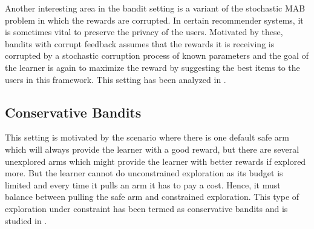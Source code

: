 Another interesting area in the bandit setting is a variant of the stochastic MAB problem in which the
rewards are corrupted. In certain recommender systems, it is sometimes vital to preserve the privacy of the users. Motivated by these, bandits with corrupt feedback assumes that the rewards it is receiving is corrupted by a stochastic corruption process of known parameters and the goal of the learner is again to maximize the reward by suggesting the best items to the users in this framework. This setting has been analyzed in \citet{DBLP:journals/corr/abs-1708-05033}.


\subsection{Conservative Bandits}

This setting is motivated by the scenario where there is one default safe arm which will always provide the learner with a good reward, but there are several unexplored arms which might provide the learner with better rewards if explored more. But the learner cannot do unconstrained exploration as its budget is limited and every time it pulls an arm it has to pay a cost. Hence, it must balance between pulling the safe arm and constrained exploration. This type of exploration under constraint has been termed as conservative bandits and is studied in \citet{DBLP:conf/icml/WuSLS16}.
